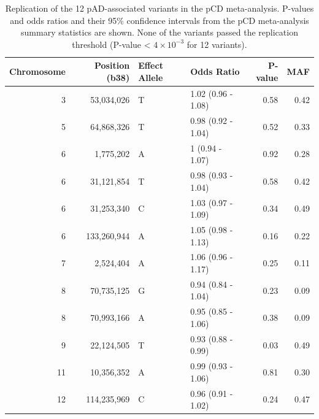 \begin{table}[H]
  \caption[Replication of the 12 pAD-associated variants in the pCD meta-analysis]{Replication of the 12 pAD-associated variants in the pCD meta-analysis. P-values and odds ratios and their 95\% confidence  intervals from the pCD meta-analysis summary statistics are shown. None of the variants passed the replication threshold (P-value < $4\times10^{-3}$ for 12 variants).}
  \label{table:pcd_replication}
  \centering\begingroup\fontsize{10}{12}\selectfont
  
  \begin{tabular}[t]{|r|r|l|l|r|r|}
  \hline
  Chromosome & Position (b38) & Effect Allele & Odds Ratio & P-value & MAF\\
  \hline
  3 & 53,034,026 & T & 1.02 (0.96 - 1.08) & 0.58 & 0.42\\
  \hline
  5 & 64,868,326 & T & 0.98 (0.92 - 1.04) & 0.52 & 0.33\\
  \hline
  6 & 1,775,202 & A & 1 (0.94 - 1.07) & 0.92 & 0.28\\
  \hline
  6 & 31,121,854 & T & 0.98 (0.93 - 1.04) & 0.58 & 0.42\\
  \hline
  6 & 31,253,340 & C & 1.03 (0.97 - 1.09) & 0.34 & 0.49\\
  \hline
  6 & 133,260,944 & A & 1.05 (0.98 - 1.13) & 0.16 & 0.22\\
  \hline
  7 & 2,524,404 & A & 1.06 (0.96 - 1.17) & 0.25 & 0.11\\
  \hline
  8 & 70,735,125 & G & 0.94 (0.84 - 1.04) & 0.23 & 0.09\\
  \hline
  8 & 70,993,166 & A & 0.95 (0.85 - 1.06) & 0.38 & 0.09\\
  \hline
  9 & 22,124,505 & T & 0.93 (0.88 - 0.99) & 0.03 & 0.49\\
  \hline
  11 & 10,356,352 & A & 0.99 (0.93 - 1.06) & 0.81 & 0.30\\
  \hline
  12 & 114,235,969 & C & 0.96 (0.91 - 1.02) & 0.24 & 0.47\\
  \hline  
  \end{tabular}
  \endgroup{}
  \end{table}

